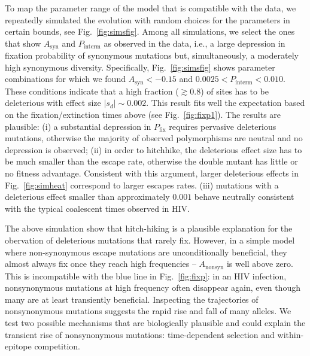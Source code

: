 \documentclass[rmp, twocolumn]{revtex4}
\newcommand{\pfix}{P_{\mathrm{fix}}}
\newcommand{\FIG}[1]{Fig.~\ref{fig:#1}}
\begin{document}
To map the parameter range of the model that is compatible with the data, we
repeatedly simulated the evolution with random choices for the parameters in
certain bounds, see \FIG{simsfig}.
Among all simulations, we select the ones that show $A_\text{syn}$ and
$P_\text{interm}$ as observed in the data, i.e., a large depression in fixation
probability of synonymous mutations but, simultaneously, a moderately high
synonymous diversity. Specifically, \FIG{simsfig} shows parameter combinations
for which we found $A_\text{syn} < -0.15$ and $0.0025 < P_\text{interm} <
0.010$. These conditions indicate that a high fraction ($\gtrsim 0.8$) of
sites has to be deleterious with effect size $|s_d| \sim 0.002$. 
This result fits well the expectation based on the fixation/extinction times above (see \FIG{fixp1}).
The results are plausible:
(i) a substantial depression in $\pfix$ requires pervasive deleterious
mutations, otherwise the majority of observed polymorphisms are neutral and no
depression is observed; (ii) in order to hitchhike, the deleterious effect size
has to be much smaller than the escape rate, otherwise the double mutant has
little or no fitness advantage. Consistent with this argument, larger
deleterious effects  in \FIG{simheat} correspond to larger escapes rates. (iii)
mutations with a deleterious effect smaller than approximately $0.001$ 
behave neutrally consistent with the typical coalescent times observed in HIV.

The above simulation show that hitch-hiking is a plausible explanation for the
obervation of deleterious mutations that rarely fix. However, in a simple model
where non-synonymous escape mutations are unconditionally beneficial, they
almost always fix once they reach high frequencies -- $A_{\mathrm{nonsyn}}$ is
well above zero. This is incompatible with the blue line in \FIG{fixp}: in an HIV infection, nonsynonymous mutations at high frequency often
disappear again, even though many are at least transiently beneficial.
Inspecting the trajectories of nonsynonymous mutations suggests the rapid rise
and fall of many alleles. We test two possible mechanisms that are biologically
plausible and could explain the transient rise of nonsynonymous mutations:
time-dependent selection and within-epitope competition.
\end{document}
